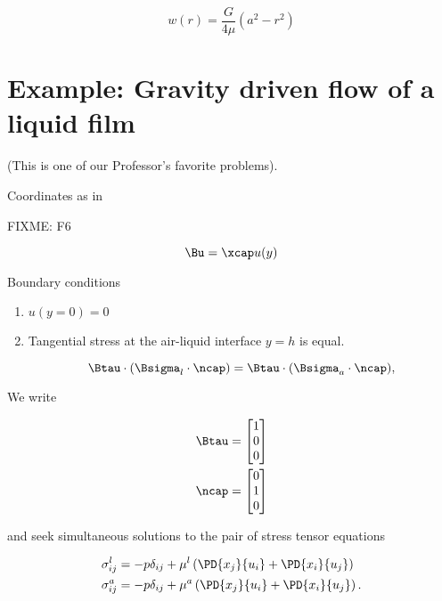 \begin{equation}\label{eqn:continuumL12:130}
w(r) = \frac{G}{4 \mu}( a^2 - r^2 )
\end{equation}

\section{Example: Gravity driven flow of a liquid film}

(This is one of our Professor's favorite problems).

Coordinates as in

FIXME: F6

\begin{equation}\label{eqn:continuumL12:150}
\Bu = \xcap u(y)
\end{equation}

Boundary conditions

\begin{enumerate}
\item $u(y = 0) = 0$
\item Tangential stress at the air-liquid interface $y = h$ is equal.

\begin{equation}\label{eqn:continuumL12:170}
\Btau \cdot (\Bsigma_l \cdot \ncap) = \Btau \cdot (\Bsigma_a \cdot \ncap),
\end{equation}
\end{enumerate}

We write 

\begin{align}\label{eqn:continuumL12:190}
\Btau &= 
\begin{bmatrix}
1 \\
0 \\
0
\end{bmatrix} \\
\ncap &= 
\begin{bmatrix}
0 \\
1 \\
0
\end{bmatrix} \\
\end{align}

and seek simultaneous solutions to the pair of stress tensor equations

\begin{align}\label{eqn:continuumL12:210}
\sigma_{ij}^l 
&= - p \delta_{ij} + \mu^l \left( 
\PD{x_j}{u_i} +
\PD{x_i}{u_j}
\right) \\
\sigma_{ij}^a 
&= - p \delta_{ij} + \mu^a \left( 
\PD{x_j}{u_i} +
\PD{x_i}{u_j}
\right).
\end{align}

